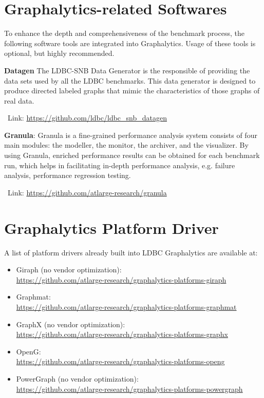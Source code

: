 \section{Graphalytics-related Softwares}\label{sec:instructions:related}
To enhance the depth and comprehensiveness of the benchmark process, the following software tools are integrated into Graphalytics. Usage of these tools is optional, but highly recommended.


\textbf{Datagen} The LDBC-SNB Data Generator is the responsible of providing the data sets used by all the LDBC benchmarks. This data generator is designed to produce directed labeled graphs that mimic the characteristics of those graphs of real data. 

\-\ Link: \url{https://github.com/ldbc/ldbc_snb_datagen}



\textbf{Granula}:  Granula is a fine-grained performance analysis system consists of four main modules: the modeller, the monitor, the archiver, and the visualizer. 
By using Granula, enriched performance results can be obtained for each benchmark run, which helps in facilitating in-depth performance analysis, e.g. failure analysis, performance regression testing.

\-\ Link: \url{https://github.com/atlarge-research/granula}







\section{Graphalytics Platform Driver}\label{sec:instructions:drivers}
A list of platform drivers already built into LDBC Graphalytics are available at:

\begin{itemize}
  \item Giraph (no vendor optimization): \\\url{https://github.com/atlarge-research/graphalytics-platforms-giraph}
	\item Graphmat: \\\url{https://github.com/atlarge-research/graphalytics-platforms-graphmat}
	\item GraphX (no vendor optimization): \\\url{https://github.com/atlarge-research/graphalytics-platforms-graphx}
	\item OpenG: \\\url{https://github.com/atlarge-research/graphalytics-platforms-openg}
	\item PowerGraph (no vendor optimization): \\\url{https://github.com/atlarge-research/graphalytics-platforms-powergraph}
\end{itemize}

